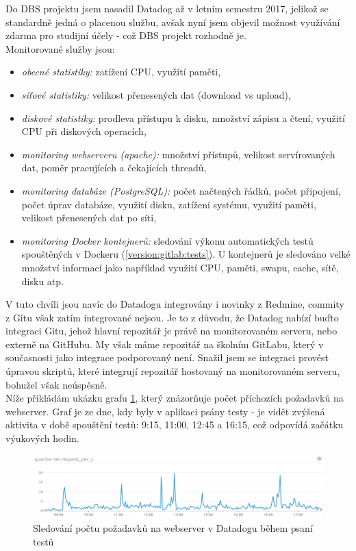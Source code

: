 Do DBS projektu jsem nasadil Datadog až v letním semestru 2017, jelikož se standardně jedná o placenou službu, avšak nyní jsem objevil možnost využívání zdarma pro studijní účely - což DBS projekt rozhodně je.\\
Monitorované služby jsou:
\begin{itemize}
	\item \emph{obecné statistiky:} zatížení CPU, využití paměti,
	\item \emph{síťové statistiky:} velikost přenesených dat (download vs upload),
	\item \emph{diskové statistiky:} prodleva přístupu k disku, množství zápisu a čtení, využití CPU při diskových operacích,
	\item \emph{monitoring webserveru (apache):} množství přístupů, velikost servírovaných dat, poměr pracujících a čekajících threadů,
	\item \emph{monitoring databáze (PostgreSQL):} počet načtených řádků, počet připojení, počet úprav databáze, využití disku, zatížení systému, využití paměti, velikost přenesených dat po síti,
	\item \emph{monitoring Docker kontejnerů:} sledování výkonu automatických testů spouštěných v Dockeru (\ref{version:gitlab:tests}). U kontejnerů je sledováno velké množství informací jako například využití CPU, paměti, swapu, cache, sítě, disku atp.
\end{itemize}
V tuto chvíli jsou navíc do Datadogu integrovány i novinky z Redmine, commity z Gitu však zatím integrované nejsou. Je to z důvodu, že Datadog nabízí buďto integraci Gitu, jehož hlavní repozitář je právě na monitorovaném serveru, nebo externě na GitHubu. My však máme repozitář na školním GitLabu, který v současnosti jako integrace podporovaný není. Snažil jsem se integraci provést úpravou skriptů, které integrují repozitář hostovaný na monitorovaném serveru, bohužel však neúspěsně.\\
Níže přikládám ukázku grafu \ref{picture:datadog-apache}, který znázorňuje počet příchozích požadavků na webserver. Graf je ze dne, kdy byly v aplikaci psány testy - je vidět zvýšená aktivita v době spouštění testů: 9:15, 11:00, 12:45 a 16:15, což odpovídá začátku výukových hodin.\\
\begin{figure}[H]
\includegraphics[width=\textwidth]{../png/datadog-apache.png}
\caption{Sledování počtu požadavků na webserver v Datadogu během psaní testů} \label{picture:datadog-apache}
\end{figure}
